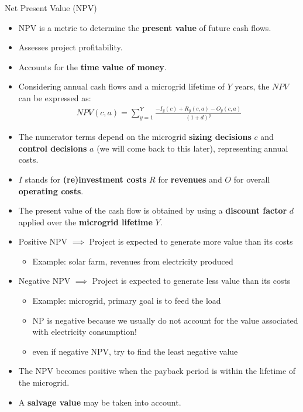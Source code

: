 \begin{frame}[allowframebreaks]{Net Present Value (NPV)}
  \begin{itemize}
    \item NPV is a metric to determine the \textbf{present value} of future cash flows.
    \item Assesses project profitability.
    \item Accounts for the \textbf{time value of money}.
    \item Considering annual cash flows and a microgrid lifetime of $Y$ years, the $NPV$ can be expressed as:
    \begin{align}
      NPV(c, a) = \sum_{y=1}^{Y} \frac{- I_{y}(c) + R_{y}(c, a) - O_{y}(c, a)}{(1 + d)^{y}}
    \end{align} 
    \item The numerator terms depend on the microgrid \textbf{sizing decisions} $c$ and \textbf{control decisions} $a$ (we will come back to this later), representing annual costs. 
    \item $I$ stands for \textbf{(re)investment costs} $R$ for \textbf{revenues} and $O$ for overall \textbf{operating costs}. 
    \item The present value of the cash flow is obtained by using a \textbf{discount factor} $d$ applied over the \textbf{microgrid lifetime} $Y$. 
    \item Positive NPV $\implies$ Project is expected to generate more value than its costs 
    \begin{itemize}
        \item Example: solar farm, revenues from electricity produced
    \end{itemize}
    \item Negative NPV $\implies$ Project is expected to generate less value than its costs
    \begin{itemize}
        \item Example: microgrid, primary goal is to feed the load
        \item NP is negative because we usually do not account for the value associated with electricity consumption!
        \item even if negative NPV, try to find the least negative value
    \end{itemize}
    \item The NPV becomes positive when the payback period is within the lifetime of the microgrid.
    \item A \textbf{salvage value} may be taken into account.
  \end{itemize}
\end{frame}

